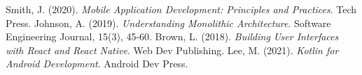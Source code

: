 \renewcommand{\bibname}{\centering References}

\begin{thebibliography}{9}
 Smith, J. (2020). \textit{Mobile Application Development: Principles and Practices}. Tech Press.
 Johnson, A. (2019). \textit{Understanding Monolithic Architecture}. Software Engineering Journal, 15(3), 45-60.
 Brown, L. (2018). \textit{Building User Interfaces with React and React Native}. Web Dev Publishing.
 Lee, M. (2021). \textit{Kotlin for Android Development}. Android Dev Press.
\end{thebibliography}